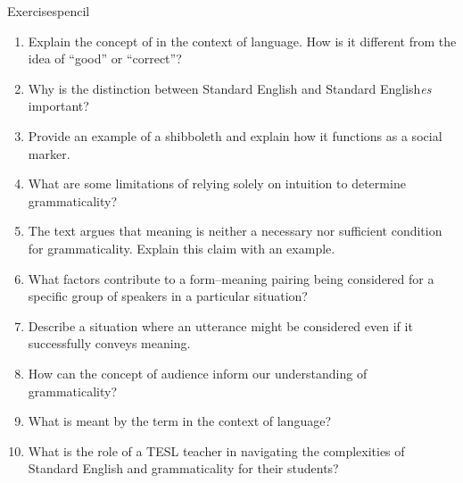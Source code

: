 \begin{tblsframedsymbol}{Exercises}{pencil}

\begin{enumerate}[noitemsep, leftmargin=*]
    \item Explain the concept of  in the context of language. How is it different from the idea of \enquote{good} or \enquote{correct}?
    \item Why is the distinction between Standard English and Standard English\emph{es} important?
    \item Provide an example of a shibboleth and explain how it functions as a social marker.
    \item What are some limitations of relying solely on intuition to determine grammaticality?
    \item The text argues that meaning is neither a necessary nor sufficient condition for grammaticality. Explain this claim with an example.
    \item What factors contribute to a form--meaning pairing being considered  for a specific group of speakers in a particular situation?
    \item Describe a situation where an utterance might be considered  even if it successfully conveys meaning.
    \item How can the concept of audience inform our understanding of grammaticality?
    \item What is meant by the term  in the context of language?
    \item What is the role of a TESL teacher in navigating the complexities of Standard English and grammaticality for their students?
\end{enumerate}

\end{tblsframedsymbol}

